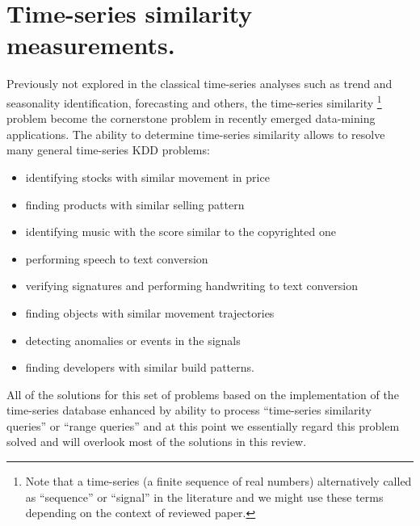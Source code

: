 \chapter{Time-series similarity measurements.}
Previously not explored in the classical time-series analyses such as trend and seasonality identification, forecasting and others, the time-series similarity \footnote{Note that a time-series (a finite sequence of real numbers) alternatively called as ``sequence'' or ``signal'' in the literature and we might use these terms depending on the context of reviewed paper.}  problem become the cornerstone problem in recently emerged data-mining applications. The ability to determine time-series similarity allows to resolve many general time-series KDD problems:
\begin{itemize}
	\item identifying stocks with similar movement in price \cite{citeulike:4295242} \cite{citeulike:4031865} \cite{citeulike:4025073}
	\item finding products with similar selling pattern \cite{citeulike:4326324}
	\item identifying music with the score similar to the copyrighted one \cite{citeulike:3821484} \cite{citeulike:3815076}
	\item performing speech to text conversion \cite{citeulike:3728228}
	\item verifying signatures and performing handwriting to text conversion \cite{citeulike:3733947} \cite{citeulike:3513035}
	\item finding objects with similar movement trajectories \cite{citeulike:964832} \cite{citeulike:3728229} \cite{citeulike:3815864}
	\item detecting anomalies or events in the signals \cite{citeulike:4412621} \cite{citeulike:4412617}
	\item finding developers with similar build patterns.
\end{itemize}

All of the solutions for this set of problems based on the implementation of the time-series database enhanced by ability to process ``time-series similarity queries'' or ``range queries'' and at this point we essentially regard this problem solved and will overlook most of the solutions in this review. 

